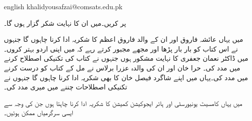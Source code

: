 {
\begin{otherlanguage*}{english}
khalidyousafzai@comsats.edu.pk
\end{otherlanguage*}
}

 پر کریں۔میں ان کا نہایت شکر گزار ہوں گا۔

میں یہاں عائشہ فاروق اور ان کے والد فاروق اعظم کا شکریہ ادا کرنا چاہوں گا جنہوں نے  اس کتاب کو بار بار پڑھا اور مجھے مجبور کرتے رہے کہ میں اپنی اردو بہتر کروں۔میں ڈاکٹر نعمان جعفری کا نہایت مشکور ہوں جنہوں  نے کتاب کی تکنیکی اصطلاح کرنے میں مدد کی۔ حرا خان اور ان کی والدہ عزرا برلاس نے مل کے کتاب کو درست کرنے میں مدد کی۔یہاں میں اپنے شاگرد فیصل خان کا بھی شکریہ ادا کرنا چاہوں گا جنہوں نے تکنیکی اصطلاحات چننے میں میری مدد کی۔

میں یہاں کامسیٹ یونیورسٹی اور ہائر ایجوکیشن کمیشن کا شکریہ ادا کرنا چاہتا ہوں جن کی وجہ سے ایسی سرگرمیاں ممکن ہوئیں۔	
\vspace{5mm}

{}
